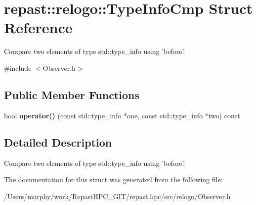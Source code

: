 \hypertarget{structrepast_1_1relogo_1_1_type_info_cmp}{\section{repast\-:\-:relogo\-:\-:Type\-Info\-Cmp Struct Reference}
\label{structrepast_1_1relogo_1_1_type_info_cmp}
}


Compare two elements of type std\-::type\-\_\-info using 'before'.  




{\ttfamily \#include $<$Observer.\-h$>$}

\subsection*{Public Member Functions}
\begin{DoxyCompactItemize}
\item 
\hypertarget{structrepast_1_1relogo_1_1_type_info_cmp_a4f70174d8421af1c26beb5ae9eb5059e}{bool {\bfseries operator()} (const std\-::type\-\_\-info $\ast$one, const std\-::type\-\_\-info $\ast$two) const }\label{structrepast_1_1relogo_1_1_type_info_cmp_a4f70174d8421af1c26beb5ae9eb5059e}

\end{DoxyCompactItemize}


\subsection{Detailed Description}
Compare two elements of type std\-::type\-\_\-info using 'before'. 

The documentation for this struct was generated from the following file\-:\begin{DoxyCompactItemize}
\item 
/\-Users/murphy/work/\-Repast\-H\-P\-C\-\_\-\-G\-I\-T/repast.\-hpc/src/relogo/Observer.\-h\end{DoxyCompactItemize}
